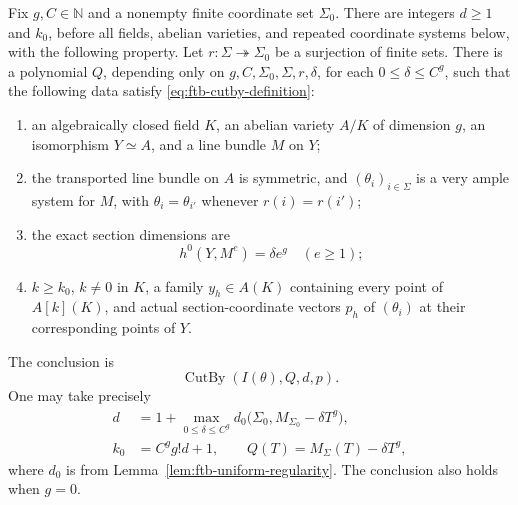 \begin{proposition}
\label{prop:ftb-uniform-torsion-forms}
Fix \(g,C\in\mathbb N\) and a nonempty finite coordinate
set \(\Sigma_0\).
There are integers \(d\ge1\) and \(k_0\), before all
fields, abelian varieties, and repeated coordinate
systems below, with the following property.
Let \(r:\Sigma\twoheadrightarrow\Sigma_0\) be a
surjection of finite sets.
There is a polynomial \(Q\), depending only on
\(g,C,\Sigma_0,\Sigma,r,\delta\), for each
\(0\le\delta\le C^g\), such that the following data
satisfy \eqref{eq:ftb-cutby-definition}:
\begin{enumerate}
\item an algebraically closed field \(K\), an abelian
variety \(A/K\) of dimension \(g\), an isomorphism
\(Y\simeq A\), and a line bundle \(M\) on \(Y\);
\item the transported line bundle on \(A\) is symmetric,
and \((\theta_i)_{i\in\Sigma}\) is a very ample system
for \(M\), with
\(\theta_i=\theta_{i'}\) whenever \(r(i)=r(i')\);
\item the exact section dimensions are
\[
                       h^0(Y,M^e)=\delta e^g\quad(e\ge1);
 \tag{TF4}\label{eq:ftb-exact-section-growth}
\]
\item \(k\ge k_0\), \(k\ne0\) in \(K\), a family
\(y_h\in A(K)\) containing every point of \(A[k](K)\),
and actual section-coordinate vectors \(p_h\) of
\((\theta_i)\) at their corresponding points of \(Y\).
\end{enumerate}
The conclusion is
\[
                         \operatorname{CutBy}(I(\theta),Q,d,p).
 \tag{TF5}\label{eq:ftb-uniform-torsion-cut}
\]
One may take precisely
\[
 \begin{split}
 d&=1+\max_{0\le\delta\le C^g}
                   d_0\bigl(\Sigma_0,M_{\Sigma_0}-\delta T^g\bigr),\\
 k_0&=C^g g!d+1,\qquad
                         Q(T)=M_\Sigma(T)-\delta T^g,
 \end{split}
 \tag{TF6}\label{eq:ftb-torsion-cut-choices}
\]
where \(d_0\) is from Lemma~\ref{lem:ftb-uniform-regularity}.
The conclusion also holds when \(g=0\).
\end{proposition}
